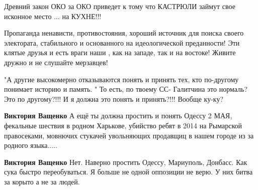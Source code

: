 \begin{itemize}
Древний закон ОКО за ОКО приведет к тому что КАСТРЮЛИ займут свое исконное место ... на КУХНЕ!!!

 

Пропаганда ненависти, противостояния, хороший источник для поиска своего
электората, стабильного и основанного на идеологической преданности! Эти клятые
друзья и есть враги наши , как на западе, так и на востоке! Живите дружно и не
слушайте мерзавцев!


 

"А другие высокомерно отказываются понять и принять тех, кто по-другому
понимает историю и память. " То есть, по твоему СС- Галитчина это нормаль? Это
по другому?!!! И я должна это понять и принять?!!! Вообще ку-ку?

\begin{itemize}
 
\textbf{Виктория Ващенко} А ещё ты должна простить и понять Одессу 2 МАЯ, фекальные шествия в родном Харькове, убийство ребят в 2014 на Рымарской правосеками, мовнючих стукачей увольняющих продавщиц в нашем городе из за родного языка.....

 
\textbf{Виктория Ващенко} Нет. Наверно простить Одессу, Мариуполь, Донбасс. Как сука быстро переобуваться. Я больше не одной оппозиции не верю. У них битва за корыто а не за людей.

 

\end{itemize}
\end{itemize}
